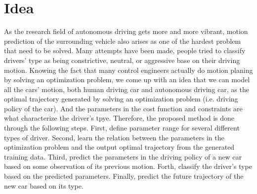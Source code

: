 \documentclass[conference]{IEEEtran}
\begin{document}
\section{Idea}
As the research field of autonomous driving gets more and more vibrant, motion prediction of the surrounding vehicle also arises as one of the hardest problem that need to be solved. Many attempts have been made, people tried to classify drivers' type as being constrictive, neutral, or aggressive base on their driving motion. Knowing the fact that many control engineers actually do motion planing by solving an optimization problem, we come up with an idea that we can model all the cars' motion, both human driving car and autonomous driving car, as the optimal trajectory generated by solving an optimization problem (i.e. driving policy of the car). And the parameters in the cost function and constraints are what characterize the driver's tpye. Therefore, the proposed method is done through the following steps. First, define parameter range for several different types of driver. Second, learn the relation between the parameters in the optimization problem and the output optimal trajectory from the generated training data. Third, predict the parameters in the driving policy of a new car based on some observation of its previous motion. Forth, classify the driver's type based on the predicted parameters. Finally, predict the future trajectory of the new car based on its type. 
\end{document}
